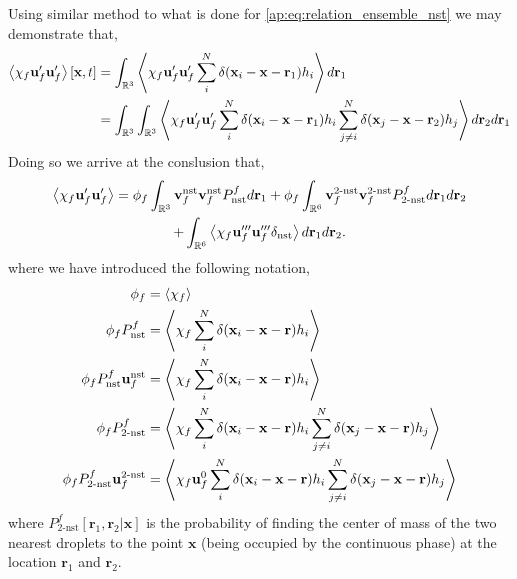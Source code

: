 Using similar method to what is done for \ref{ap:eq:relation_ensemble_nst} we may demonstrate that,  
\begin{align*}
    \left<\chi_f \textbf{u}_f'\textbf{u}_f'\right>[\textbf{x},t]
    &= 
    \int_{\mathbb{R}^3}
    \left<\chi_f \textbf{u}_f'\textbf{u}_f' 
    \sum_i^N \delta(\textbf{x}_i - \textbf{x}- \textbf{r}_1)
    h_i
    \right>
    d\textbf{r}_1\\
    &= 
    \int_{\mathbb{R}^3}
    \int_{\mathbb{R}^3}
    \left<\chi_f \textbf{u}_f'\textbf{u}_f' 
    \sum_i^N \delta(\textbf{x}_i - \textbf{x}- \textbf{r}_1)
    h_i
    \sum_{j\neq i}^N \delta(\textbf{x}_j - \textbf{x}- \textbf{r}_2)
    h_j
    \right>
    d\textbf{r}_2
    d\textbf{r}_1
\end{align*}
Doing so we arrive at the conslusion that, 
\begin{multline}
    \left<\chi_f \textbf{u}_f'\textbf{u}_f'\right>
    = 
    \phi_f
    \int_{\mathbb{R}^3}
    \textbf{v}_f^\text{nst}
    \textbf{v}_f^\text{nst}
    P_\text{nst}^f
    d\textbf{r}_1
    + 
    \phi_f
    \int_{\mathbb{R}^6}
    \textbf{v}_f^\text{2-nst}
    \textbf{v}_f^\text{2-nst}
    P_\text{2-nst}^f
    d\textbf{r}_1
    d\textbf{r}_2 \\
    + 
    \int_{\mathbb{R}^6}
    \left<
        \chi_f
        \textbf{u}_f'''
        \textbf{u}_f'''
        \delta_\text{nst}
    \right>
    d\textbf{r}_1
    d\textbf{r}_2.
\end{multline}
where we have introduced the following notation, 
\begin{align}
    \phi_f
    &= 
    \left<\chi_f\right>\\
    \phi_f P_\text{nst}^f 
    &= 
    \left<\chi_f  
    \sum_i^N \delta(\textbf{x}_i - \textbf{x}- \textbf{r})
    h_i
    \right>\\
    \phi_f P_\text{nst}^f \textbf{u}_f^\text{nst}
    &= 
    \left<\chi_f  
    \sum_i^N \delta(\textbf{x}_i - \textbf{x}- \textbf{r})
    h_i
    \right>\\
    \phi_f P_\text{2-nst}^f
    &= 
    \left<\chi_f  
    \sum_i^N \delta(\textbf{x}_i - \textbf{x}- \textbf{r})
    h_i
    \sum_{j\neq i}^N \delta(\textbf{x}_j - \textbf{x}- \textbf{r})
    h_j
    \right>\\
    \phi_f P_\text{2-nst}^f \textbf{u}_f^\text{2-nst}
    &= 
    \left<\chi_f \textbf{u}_f^0 
    \sum_i^N \delta(\textbf{x}_i - \textbf{x}- \textbf{r})
    h_i
    \sum_{j\neq i}^N \delta(\textbf{x}_j - \textbf{x}- \textbf{r})
    h_j
    \right>
\end{align}
where $P_\text{2-nst}^f[\textbf{r}_1, \textbf{r}_2|\textbf{x}]$ is the probability of finding the center of mass of the two nearest droplets to the point $\textbf{x}$ (being occupied by the continuous phase) at the location $\textbf{r}_1$ and $\textbf{r}_2$.  

